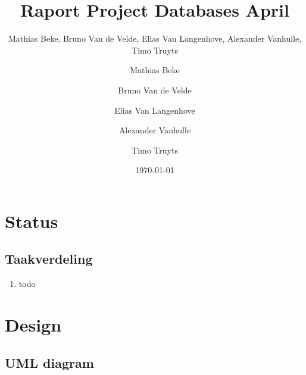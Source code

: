 \documentclass[11pt]{article}
\title{Raport Project Databases April}
\author{Mathias Beke, Bruno Van de Velde, Elias Van Langenhove, Alexander Vanhulle, Timo Truyts}
\author{
  Mathias Beke
  \and
  Bruno Van de Velde
  \and
  Elias Van Langenhove
  \and
  Alexander Vanhulle
  \and
  Timo Truyts
}
\date{\today}
\begin{document}
\rhead{}



\maketitle


\tableofcontents





\section{Status}




\subsection{Taakverdeling}


\begin{enumerate}
    
   \item todo    
    
\end{enumerate}




\section{Design}


\subsection{UML diagram}
\end{document}
